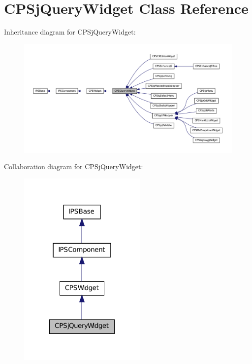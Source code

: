 \hypertarget{classCPSjQueryWidget}{
\section{CPSjQueryWidget Class Reference}
\label{classCPSjQueryWidget}
}


Inheritance diagram for CPSjQueryWidget:\nopagebreak
\begin{figure}[H]
\begin{center}
\leavevmode
\includegraphics[width=400pt]{classCPSjQueryWidget__inherit__graph}
\end{center}
\end{figure}


Collaboration diagram for CPSjQueryWidget:\nopagebreak
\begin{figure}[H]
\begin{center}
\leavevmode
\includegraphics[width=178pt]{classCPSjQueryWidget__coll__graph}
\end{center}
\end{figure}
